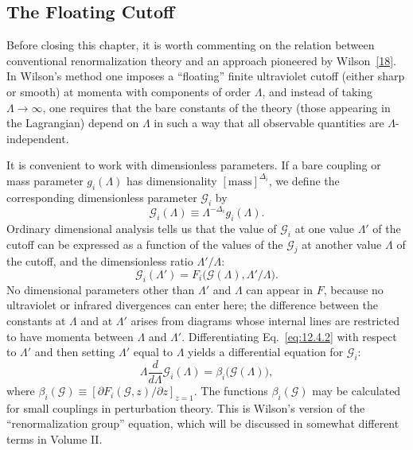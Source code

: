 
\subsection[The Floating Cutoff]{The Floating Cutoff\texorpdfstring{\protect\footnotemark}{}}

Before closing this chapter, it is worth commenting on the relation between
conventional renormalization theory and an approach pioneered by
Wilson~\hyperref[ref:12.18]{[18]}. In Wilson's method one imposes a
``floating'' finite ultraviolet cutoff (either sharp or smooth) at momenta with
components of order $\Lambda$, and instead of taking $\Lambda\to\infty$, one
requires that the bare constants of the theory (those appearing in the
Lagrangian) depend on $\Lambda$ in such a way that all observable quantities
are $\Lambda$-independent.

It is convenient to work with dimensionless parameters. If a bare coupling or
mass parameter $g_i(\Lambda)$ has dimensionality $[\text{mass}]^{\Delta_i}$,
we define the corresponding dimensionless parameter $\mathcal G_i$ by
\begin{equation}
\mathcal G_i(\Lambda)\equiv\Lambda^{-\Delta_i}g_i(\Lambda).
\tag{12.4.1}\label{eq:12.4.1}
\end{equation}
Ordinary dimensional analysis tells us that the value of $\mathcal G_i$ at one
value $\Lambda'$ of the cutoff can be expressed as a function of the values of
the $\mathcal G_j$ at another value $\Lambda$ of the cutoff, and the
dimensionless ratio $\Lambda'/\Lambda$:
\begin{equation}
\mathcal G_i(\Lambda')=F_i\bigl(\mathcal G(\Lambda),\Lambda'/\Lambda\bigr).
\tag{12.4.2}\label{eq:12.4.2}
\end{equation}
No dimensional parameters other than $\Lambda'$ and $\Lambda$ can appear in
$F$, because no ultraviolet or infrared divergences can enter here; the
difference between the constants at $\Lambda$ and at $\Lambda'$ arises from
diagrams whose internal lines are restricted to have momenta between
$\Lambda$ and $\Lambda'$. Differentiating Eq.~\eqref{eq:12.4.2} with respect
to $\Lambda'$ and then setting $\Lambda'$ equal to $\Lambda$ yields a
differential equation for $\mathcal G_i$:
\begin{equation}
\Lambda\frac{d}{d\Lambda}\mathcal G_i(\Lambda)
=\beta_i\bigl(\mathcal G(\Lambda)\bigr),
\tag{12.4.3}\label{eq:12.4.3}
\end{equation}
where $\beta_i(\mathcal G)\equiv
[\partial F_i(\mathcal G,z)/\partial z]_{z=1}$. The functions
$\beta_i(\mathcal G)$ may be calculated for small couplings in perturbation
theory. This is Wilson's version of the ``renormalization group'' equation,
which will be discussed in somewhat different terms in Volume II.

